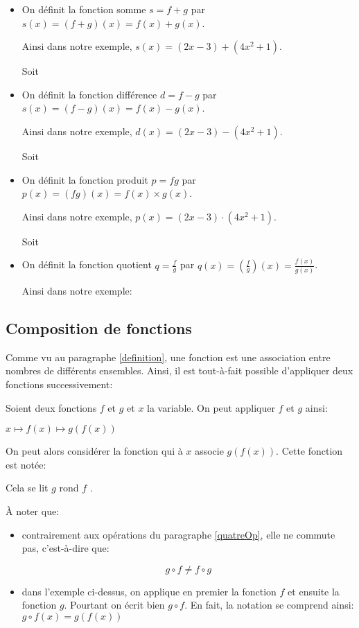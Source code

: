 \documentclass[a4paper,12pt]{scrartcl}
\begin{document}
\begin{itemize}
\item On définit la fonction somme $s = f+g$ par $s(x) = (f+g)(x) = f(x) + g(x)$.

Ainsi dans notre exemple, $s(x) = (2x-3)+(4x^2+1)$.

Soit 

\item On définit la fonction différence $d = f-g$ par $s(x) = (f-g)(x) = f(x) - g(x)$.

Ainsi dans notre exemple, $d(x) = (2x-3)-(4x^2+1)$.

Soit 

\item On définit la fonction produit $p = fg$ par $p(x) = (fg)(x) = f(x) \times g(x)$.

Ainsi dans notre exemple, $p(x) = (2x-3) \cdot (4x^2+1)$.

Soit 

\item On définit la fonction quotient $q = \frac{f}{g}$ par $q(x) = \left( \frac{f}{g} \right)(x) = \frac{f(x)}{g(x)}$.

Ainsi dans notre exemple: 
\end{itemize}

\subsection{Composition de fonctions}

Comme vu au paragraphe \ref{definition}, une fonction est une association entre nombres de différents ensembles. Ainsi, il est tout-à-fait possible d'appliquer deux fonctions successivement:

Soient deux fonctions $f$ et $g$ et $x$ la variable. On peut appliquer $f$ et $g$ ainsi: 

$x \longmapsto f(x) \longmapsto g(f(x))$

On peut alors considérer la fonction qui à $x$ associe $g(f(x))$. Cette fonction est notée: 


Cela se lit \og $g$ rond $f$ \fg{}.

À noter que: 

\begin{itemize}
\item contrairement aux opérations du paragraphe \ref{quatreOp}, elle ne commute pas, c'est-à-dire que:

\begin{equation*}
g \circ f \neq f \circ g
\end{equation*}

\item dans l'exemple ci-dessus, on applique en premier la fonction $f$ et ensuite la fonction $g$. Pourtant on écrit bien $g \circ f$. En fait, la notation se comprend ainsi: $g \circ f (x) = g(f(x))$
\end{itemize}
\end{document}
